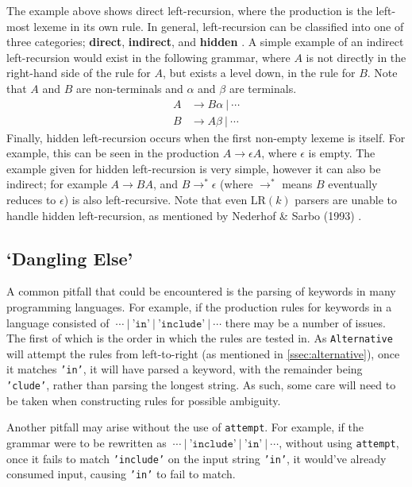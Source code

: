 The example above shows direct left-recursion, where the production is the left-most lexeme in its own rule.
In general, left-recursion can be classified into one of three categories; \textbf{direct}, \textbf{indirect}, and \textbf{hidden} \cite{diflrecs}.
A simple example of an indirect left-recursion would exist in the following grammar, where $A$ is not directly in the right-hand side of the rule for $A$, but exists a level down, in the rule for $B$.
Note that $A$ and $B$ are non-terminals and $\alpha$ and $\beta$ are terminals.
\begin{align*}
    A & \rightarrow B \alpha\ |\ \cdots \\
    B & \rightarrow A \beta\ |\ \cdots
\end{align*}
Finally, hidden left-recursion occurs when the first non-empty lexeme is itself.
For example, this can be seen in the production $A \rightarrow \epsilon A$, where $\epsilon$ is empty.
The example given for hidden left-recursion is very simple, however it can also be indirect; for example $A \rightarrow BA$, and $B \rightarrow^* \epsilon$ (where $\rightarrow^*$ means $B$ eventually reduces to $\epsilon$) is also left-recursive.
Note that even $\text{LR}(k)$ parsers are unable to handle hidden left-recursion, as mentioned by Nederhof \& Sarbo (1993) \cite{nederhof93}.

\subsection{`Dangling Else'}
\label{ssec:dangling_else}

A common pitfall that could be encountered is the parsing of keywords in many programming languages.
For example, if the production rules for keywords in a language consisted of $\ \cdots\ |\ \texttt{'in'}\ |\ \texttt{'include'}\ |\ \cdots$ there may be a number of issues.
The first of which is the order in which the rules are tested in.
As \texttt{Alternative} will attempt the rules from left-to-right (as mentioned in \autoref{ssec:alternative}), once it matches \texttt{'in'}, it will have parsed a keyword, with the remainder being \texttt{'clude'}, rather than parsing the longest string.
As such, some care will need to be taken when constructing rules for possible ambiguity.

Another pitfall may arise without the use of \texttt{attempt}.
For example, if the grammar were to be rewritten as $\ \cdots\ |\ \texttt{'include'}\ |\ \texttt{'in'}\ |\ \cdots$, without using \texttt{attempt}, once it fails to match \texttt{'include'} on the input string \texttt{'in'}, it would've already consumed input, causing \texttt{'in'} to fail to match.

